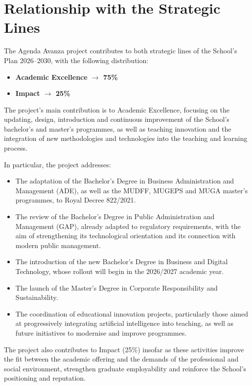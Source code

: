 \documentclass[11pt,a4paper]{scrreprt}
\begin{document}
\section{Relationship with the Strategic Lines}

\small
The Agenda Avanza project contributes to both strategic lines of the School's Plan 2026--2030, with the following distribution:

\begin{itemize}[noitemsep,topsep=2pt]
\item \textbf{Academic Excellence $\rightarrow$ 75\%}
\item \textbf{Impact $\rightarrow$ 25\%}
\end{itemize}
The project's main contribution is to Academic Excellence, focusing on the updating, design, introduction and continuous improvement of the School's bachelor's and master's programmes, as well as teaching innovation and the integration of new methodologies and technologies into the teaching and learning process.

In particular, the project addresses:
\begin{itemize}[noitemsep,topsep=2pt]
\item The adaptation of the Bachelor's Degree in Business Administration and Management (ADE), as well as the MUDFF, MUGEPS and MUGA master's programmes, to Royal Decree 822/2021.
\item The review of the Bachelor's Degree in Public Administration and Management (GAP), already adapted to regulatory requirements, with the aim of strengthening its technological orientation and its connection with modern public management.
\item The introduction of the new Bachelor's Degree in Business and Digital Technology, whose rollout will begin in the 2026/2027 academic year.
\item The launch of the Master's Degree in Corporate Responsibility and Sustainability.
\item The coordination of educational innovation projects, particularly those aimed at progressively integrating artificial intelligence into teaching, as well as future initiatives to modernise and improve programmes.
\end{itemize}

The project also contributes to Impact (25\%) insofar as these activities improve the fit between the academic offering and the demands of the professional and social environment, strengthen graduate employability and reinforce the School's positioning and reputation.
\end{document}
